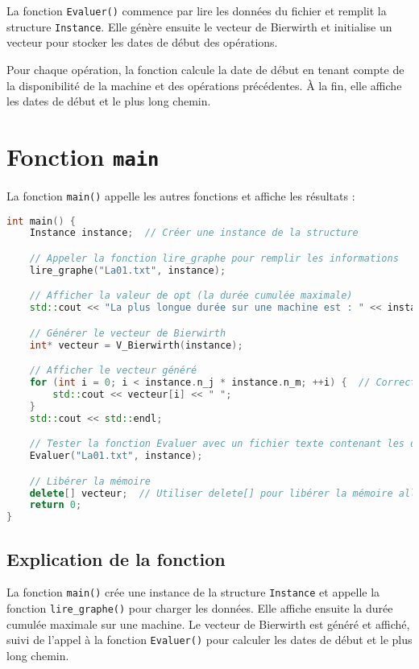 \documentclass[a4paper,12pt]{article}
\begin{document}
La fonction \texttt{Evaluer()} commence par lire les données du fichier et remplit la structure \texttt{Instance}. Elle génère ensuite le vecteur de Bierwirth et initialise un vecteur pour stocker les dates de début des opérations. 

Pour chaque opération, la fonction calcule la date de début en tenant compte de la disponibilité de la machine et des opérations précédentes. À la fin, elle affiche les dates de début et le plus long chemin.

\section{Fonction \texttt{main}}

La fonction \texttt{main()} appelle les autres fonctions et affiche les résultats :

\begin{lstlisting}[language=C++]
int main() {
    Instance instance;  // Créer une instance de la structure

    // Appeler la fonction lire_graphe pour remplir les informations
    lire_graphe("La01.txt", instance);

    // Afficher la valeur de opt (la durée cumulée maximale)
    std::cout << "La plus longue durée sur une machine est : " << instance.opt << std::endl;

    // Générer le vecteur de Bierwirth
    int* vecteur = V_Bierwirth(instance);

    // Afficher le vecteur généré
    for (int i = 0; i < instance.n_j * instance.n_m; ++i) {  // Correction ici
        std::cout << vecteur[i] << " ";
    }
    std::cout << std::endl;

    // Tester la fonction Evaluer avec un fichier texte contenant les données des jobs et des machines
    Evaluer("La01.txt", instance);

    // Libérer la mémoire
    delete[] vecteur;  // Utiliser delete[] pour libérer la mémoire allouée
    return 0;
}
\end{lstlisting}

\subsection{Explication de la fonction}

La fonction \texttt{main()} crée une instance de la structure \texttt{Instance} et appelle la fonction \texttt{lire\_graphe()} pour charger les données. Elle affiche ensuite la durée cumulée maximale sur une machine. Le vecteur de Bierwirth est généré et affiché, suivi de l'appel à la fonction \texttt{Evaluer()} pour calculer les dates de début et le plus long chemin.
\end{document}
